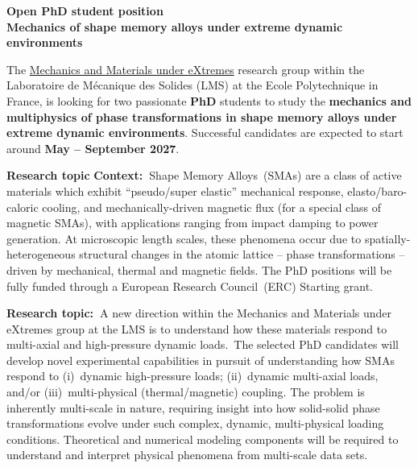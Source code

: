 \documentclass[a4paper,11pt,fleqn]{article}
\begin{document}
	\setlength{\abovedisplayskip}{2 pt}
	\setlength{\belowdisplayskip}{2 pt}
	\sffamily
	\thispagestyle{titlepage}
	\begin{center}
		\vspace*{0em}
		\Large \textbf{Open PhD student position \\ Mechanics of shape memory alloys under extreme dynamic environments} 
	\end{center}
	
	The \href{https://vigneshkannan-group.github.io/vk-mxm-website/}{Mechanics and Materials under eXtremes} research group within the Laboratoire de M{\'e}canique des Solides (LMS) at the Ecole Polytechnique in France, is looking for two passionate \textbf{PhD} students to study the \textbf{mechanics and multiphysics of phase transformations in shape memory alloys under extreme dynamic environments}. Successful candidates are expected to start around \textbf{May -- September 2027}. 

	\begin{myhlbox}{\textbf{Research topic}}
		\textbf{Context:~}Shape Memory Alloys~(SMAs) are a class of active materials which exhibit ``pseudo/super elastic'' mechanical response, elasto/baro-caloric cooling, and mechanically-driven magnetic flux (for a special class of magnetic SMAs), with applications ranging from impact damping to power generation. At microscopic length scales, these phenomena occur due to spatially-heterogeneous structural changes in the atomic lattice -- phase transformations -- driven by mechanical, thermal and magnetic fields. The PhD positions will be fully funded through a European Research Council~(ERC) Starting grant. 
		
		\textbf{Research topic:~}A new direction within the Mechanics and Materials under eXtremes group at the LMS is to understand how these materials respond to multi-axial and high-pressure dynamic loads.~The selected PhD candidates will develop novel experimental capabilities in pursuit of understanding how SMAs respond to (i)~dynamic high-pressure loads; (ii)~dynamic multi-axial loads, and/or (iii)~multi-physical (thermal/magnetic) coupling. The problem is inherently multi-scale in nature, requiring insight into how solid-solid phase transformations evolve under such complex, dynamic, multi-physical loading conditions. Theoretical and numerical modeling components will be required to understand and interpret physical phenomena from multi-scale data sets. 
	
	\end{myhlbox}
	
\end{document}

